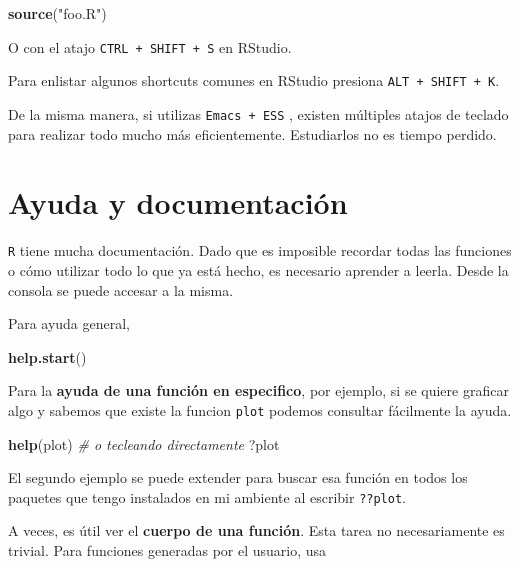 \documentclass[]{article}
\newenvironment{Shaded}{\begin{snugshade}}{\end{snugshade}}
\newcommand{\KeywordTok}[1]{\textcolor[rgb]{0.13,0.29,0.53}{\textbf{#1}}}
\newcommand{\StringTok}[1]{\textcolor[rgb]{0.31,0.60,0.02}{#1}}
\newcommand{\CommentTok}[1]{\textcolor[rgb]{0.56,0.35,0.01}{\textit{#1}}}
\newcommand{\NormalTok}[1]{#1}
\begin{document}
\begin{Shaded}
\begin{Highlighting}[]
\KeywordTok{source}\NormalTok{(}\StringTok{"foo.R"}\NormalTok{)}
\end{Highlighting}
\end{Shaded}

O con el atajo \texttt{CTRL\ +\ SHIFT\ +\ S} en RStudio.

Para enlistar algunos shortcuts comunes en RStudio presiona
\texttt{ALT\ +\ SHIFT\ +\ K}.

De la misma manera, si utilizas \texttt{Emacs\ +\ ESS}
\parencite{rossini2004ess}, existen múltiples atajos de teclado para
realizar todo mucho más eficientemente. Estudiarlos no es tiempo
perdido.

\section{Ayuda y documentación}\label{ayuda-y-documentacion}

\texttt{R} tiene mucha documentación. Dado que es imposible recordar
todas las funciones o cómo utilizar todo lo que ya está hecho, es
necesario aprender a leerla. Desde la consola se puede accesar a la
misma.

Para ayuda general,

\begin{Shaded}
\begin{Highlighting}[]
\KeywordTok{help.start}\NormalTok{()}
\end{Highlighting}
\end{Shaded}

Para la \textbf{ayuda de una función en especifico}, por ejemplo, si se
quiere graficar algo y sabemos que existe la funcion \texttt{plot}
podemos consultar fácilmente la ayuda.

\begin{Shaded}
\begin{Highlighting}[]
\KeywordTok{help}\NormalTok{(plot)}
\CommentTok{# o tecleando directamente}
\NormalTok{?plot}
\end{Highlighting}
\end{Shaded}

El segundo ejemplo se puede extender para buscar esa función en todos
los paquetes que tengo instalados en mi ambiente al escribir
\texttt{??plot}.

A veces, es útil ver el \textbf{cuerpo de una función}. Esta tarea no
necesariamente es trivial. Para funciones generadas por el usuario, usa
\end{document}
